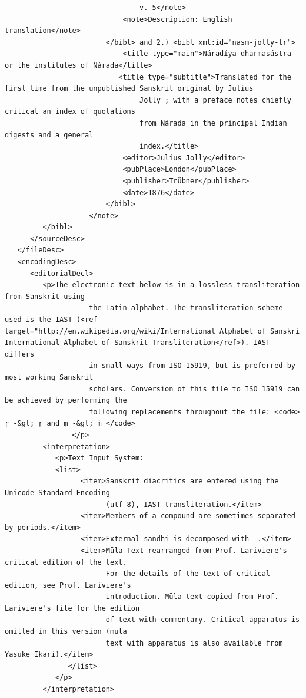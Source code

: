 \documentclass[article,12pt,a4paper]{memoir}%
\begin{document}
\begin{verbatim}
                                v. 5</note>
                            <note>Description: English translation</note>
                        </bibl> and 2.) <bibl xml:id="nāsm-jolly-tr">
                            <title type="main">Náradíya dharmasástra or the institutes of Nárada</title>
			               <title type="subtitle">Translated for the first time from the unpublished Sanskrit original by Julius
                                Jolly ; with a preface notes chiefly critical an index of quotations
                                from Nárada in the principal Indian digests and a general
                                index.</title>
                            <editor>Julius Jolly</editor>
                            <pubPlace>London</pubPlace>
                            <publisher>Trübner</publisher>
                            <date>1876</date>
                        </bibl>
                    </note>
         </bibl>
      </sourceDesc>
   </fileDesc>
   <encodingDesc>
      <editorialDecl>
         <p>The electronic text below is in a lossless transliteration from Sanskrit using
                    the Latin alphabet. The transliteration scheme used is the IAST (<ref target="http://en.wikipedia.org/wiki/International_Alphabet_of_Sanskrit_Transliteration">The International Alphabet of Sanskrit Transliteration</ref>). IAST differs
                    in small ways from ISO 15919, but is preferred by most working Sanskrit
                    scholars. Conversion of this file to ISO 15919 can be achieved by performing the
                    following replacements throughout the file: <code> ṛ -&gt; r̥ and ṃ -&gt; ṁ </code>
                </p>
         <interpretation>
            <p>Text Input System:
		    <list>
                  <item>Sanskrit diacritics are entered using the Unicode Standard Encoding
                        (utf-8), IAST transliteration.</item>
                  <item>Members of a compound are sometimes separated by periods.</item>
                  <item>External sandhi is decomposed with -.</item>
                  <item>Mūla Text rearranged from Prof. Lariviere's critical edition of the text.
                        For the details of the text of critical edition, see Prof. Lariviere's
                        introduction. Mūla text copied from Prof. Lariviere's file for the edition
                        of text with commentary. Critical apparatus is omitted in this version (mūla
                        text with apparatus is also available from Yasuke Ikari).</item>
               </list>
            </p>
         </interpretation>

\end{verbatim}
\end{document}
